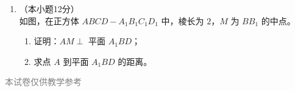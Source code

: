 \documentclass[12pt, a4paper]{ctexart}
\begin{document}
\begin{enumerate}[resume]
\vspace{6cm}

\item[22.]（本小题12分）\\
如图，在正方体 $ABCD-A_1B_1C_1D_1$ 中，棱长为 $2$，$M$ 为 $BB_1$ 的中点。
\begin{enumerate}[(1)]
  \item 证明：$AM\perp$ 平面 $A_1BD$；
  \item 求点 $A$ 到平面 $A_1BD$ 的距离。
\end{enumerate}

\vspace{6cm}
\end{enumerate}

\vfill
\begin{center}
\small\textcolor{gray}{本试卷仅供教学参考}
\end{center}
\end{document}
